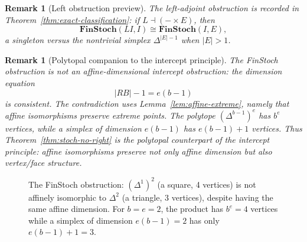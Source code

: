 \documentclass[11pt]{article}
\newtheorem{remark}[theorem]{Remark}
\begin{document}
\begin{remark}[Left obstruction preview]
\label{rem:finstoch-left-preview}
The left-adjoint obstruction is recorded in
Theorem~\ref{thm:exact-classification}: if $L\dashv(-\times E)$, then
\[
\mathbf{FinStoch}(LI,I)\cong\mathbf{FinStoch}(I,E),
\]
a singleton versus the nontrivial simplex $\Delta^{|E|-1}$ when $|E|>1$.
\end{remark}

\begin{remark}[Polytopal companion to the intercept principle]
\label{rem:finstoch-polytopal}
The FinStoch obstruction is not an affine-dimensional intercept obstruction:
the dimension equation
\[
|RB|-1=e(b-1)
\]
is consistent. The contradiction uses Lemma~\ref{lem:affine-extreme}, namely
that affine isomorphisms preserve extreme points. The polytope
$(\Delta^{b-1})^e$ has $b^e$ vertices, while a simplex of dimension
$e(b-1)$ has $e(b-1)+1$ vertices. Thus
Theorem~\ref{thm:stoch-no-right} is the polytopal counterpart of the
intercept principle: affine isomorphisms preserve not only affine dimension
but also vertex/face structure.
\end{remark}

\begin{figure}[htbp]
\centering
{}
\caption{The FinStoch obstruction: $(\Delta^1)^2$ (a square, 4 vertices)
is not affinely isomorphic to $\Delta^2$ (a triangle, 3 vertices), despite
having the same affine dimension. For $b=e=2$, the product has $b^e=4$
vertices while a simplex of dimension $e(b-1)=2$ has only
$e(b-1)+1=3$.}
\label{fig:finstoch-polytope}
\end{figure}
\end{document}
